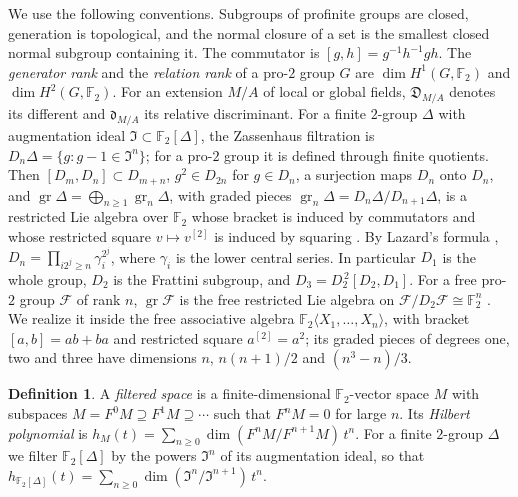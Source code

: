 \documentclass[11pt]{amsart}
\numberwithin{equation}{section}
\theoremstyle{definition}
\newtheorem{definition}[equation]{Definition}
\theoremstyle{remark}
\newcommand{\Ftwo}{\mathbb F_2}
\begin{document}
We use the following conventions. Subgroups of profinite groups are closed,
generation is topological, and the normal closure of a set is the smallest
closed normal subgroup containing it. The commutator is
$[g,h]=g^{-1}h^{-1}gh$. The \emph{generator rank} and the \emph{relation
rank} of a pro-$2$ group $G$ are $\dim H^1(G,\Ftwo)$ and $\dim H^2(G,\Ftwo)$.
For an extension $M/A$ of local or global fields, $\mathfrak D_{M/A}$ denotes
its different and $\mathfrak d_{M/A}$ its relative discriminant. For a finite
$2$-group $\Delta$ with augmentation
ideal $\mathfrak I\subset\Ftwo[\Delta]$, the Zassenhaus filtration is
$D_n\Delta=\{g:g-1\in\mathfrak I^n\}$; for a pro-$2$ group it is defined
through finite quotients. Then $[D_m,D_n]\subset D_{m+n}$, $g^2\in D_{2n}$
for $g\in D_n$, a surjection maps $D_n$ onto $D_n$, and
$\operatorname{gr}\Delta=\bigoplus_{n\ge1}\operatorname{gr}_n\Delta$, with
graded pieces $\operatorname{gr}_n\Delta=D_n\Delta/D_{n+1}\Delta$, is a
restricted Lie algebra over $\Ftwo$ whose bracket is induced by commutators
and whose restricted square $v\mapsto v^{[2]}$ is induced by squaring
\cite{Jennings,Quillen,Ershov2012}. By Lazard's formula
\cite[Proposition~3.2]{Ershov2012}, $D_n=\prod_{i2^j\ge n}\gamma_i^{2^j}$,
where $\gamma_i$ is the lower central series. In particular $D_1$ is the
whole group, $D_2$ is the Frattini subgroup, and $D_3=D_2^{\,2}[D_2,D_1]$. For
a free pro-$2$ group $\mathcal F$ of rank $n$, $\operatorname{gr}\mathcal F$
is the free restricted Lie algebra on $\mathcal F/D_2\mathcal F\cong\Ftwo^n$
\cite{Quillen,Ershov2012}. We realize it inside the free associative
algebra $\Ftwo\langle X_1,\dots,X_n\rangle$, with bracket $[a,b]=ab+ba$ and
restricted square $a^{[2]}=a^2$; its graded pieces of degrees one, two and
three have dimensions $n$, $n(n+1)/2$ and $(n^3-n)/3$.

\begin{definition}\label{tw:hilbert-def}
A \emph{filtered space} is a finite-dimensional $\Ftwo$-vector space $M$
with subspaces $M=F^0M\supseteq F^1M\supseteq\cdots$ such that $F^nM=0$ for
large $n$. Its \emph{Hilbert polynomial} is
$h_M(t)=\sum_{n\ge0}\dim(F^nM/F^{n+1}M)\,t^n$. For a finite $2$-group
$\Delta$ we filter $\Ftwo[\Delta]$ by the powers $\mathfrak I^n$ of its
augmentation ideal, so that
$h_{\Ftwo[\Delta]}(t)=\sum_{n\ge0}\dim(\mathfrak I^n/\mathfrak I^{n+1})\,t^n$.
\end{definition}
\end{document}
